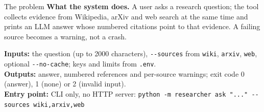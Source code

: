 \documentclass[aspectratio=169,11pt]{beamer}
\begin{document}
\begin{frame}{The problem}
  \noindent\small\textbf{What the system does.} A user asks a research question; the tool
  collects evidence from Wikipedia, arXiv and web search at the same time and prints an LLM
  answer whose numbered citations point to that evidence. A failing source becomes a warning,
  not a crash.

  \vspace{0.2em}
  \begin{center}
  \end{center}

  \vspace{0.1em}
  {\footnotesize
  \textbf{Inputs:} the question (up to 2000 characters), \texttt{-{}-sources} from \texttt{wiki},
  \texttt{arxiv}, \texttt{web}, optional \texttt{-{}-no-cache}; keys and limits from \texttt{.env}.\\[3pt]
  \textbf{Outputs:} answer, numbered references and per-source warnings; exit code 0 (answer),
  1 (none) or 2 (invalid input).\\[3pt]
  \textbf{Entry point:} CLI only, no HTTP server:\enspace
  {\scriptsize\texttt{python -m researcher ask "..." -{}-sources wiki,arxiv,web}}}
\end{frame}
\end{document}
